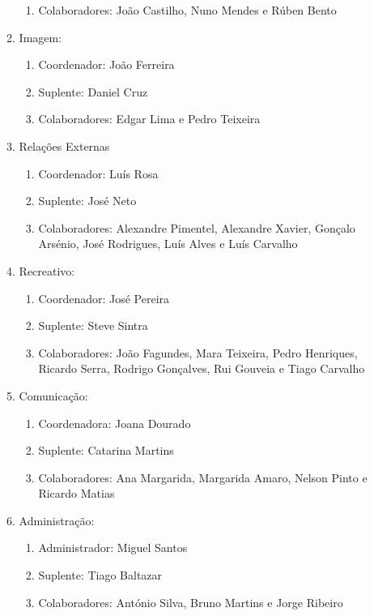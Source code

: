 \begin{enumerate}
\begin{enumerate}
\begin{enumerate}
    \item Colaboradores: João Castilho, Nuno Mendes e Rúben Bento
    \end{enumerate}
  \item Imagem:
    \begin{enumerate}
    \item Coordenador: João Ferreira
    \item Suplente: Daniel Cruz
    \item Colaboradores: Edgar Lima e Pedro Teixeira
    \end{enumerate}
  \item Relações Externas
    \begin{enumerate}
    \item Coordenador: Luís Rosa
    \item Suplente: José Neto
    \item Colaboradores: Alexandre Pimentel, Alexandre Xavier, Gonçalo Arsénio, José Rodrigues, Luís Alves e Luís Carvalho
    \end{enumerate}
  \item Recreativo:
    \begin{enumerate}
    \item Coordenador: José Pereira
    \item Suplente: Steve Sintra
    \item Colaboradores: João Fagundes, Mara Teixeira, Pedro Henriques, Ricardo Serra, Rodrigo Gonçalves, Rui Gouveia e Tiago Carvalho
    \end{enumerate}
  \item Comunicação:
    \begin{enumerate}
    \item Coordenadora: Joana Dourado
    \item Suplente: Catarina Martins
    \item Colaboradores: Ana Margarida, Margarida Amaro, Nelson Pinto e Ricardo Matias
    \end{enumerate}
  \item Administração:
    \begin{enumerate}
    \item Administrador: Miguel Santos
    \item Suplente: Tiago Baltazar
    \item Colaboradores: António Silva, Bruno Martins e Jorge Ribeiro 
    \end{enumerate}
  \end{enumerate}
\end{enumerate}

